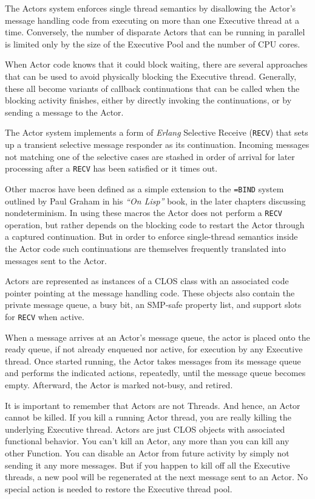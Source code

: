 \documentclass[article,oneside]{memoir}
\begin{document}
The Actors system enforces single thread semantics by disallowing the Actor's message handling code from executing on more than one Executive thread at a time. Conversely, the number of disparate Actors that can be running in parallel is limited only by the size of the Executive Pool and the number of CPU cores.

When Actor code knows that it could block waiting, there are several approaches that can be used to avoid physically blocking the Executive thread. Generally, these all become variants of callback continuations that can be called when the blocking activity finishes, either by directly invoking the continuations, or by sending a message to the Actor. 

The Actor system implements a form of \textit{Erlang} Selective Receive (\texttt{RECV}) that sets up a transient selective message responder as its continuation. Incoming messages not matching one of the selective cases are stashed in order of arrival for later processing after a \texttt{RECV} has been satisfied or it times out.

Other macros have been defined as a simple extension to the \texttt{=BIND} system outlined by Paul Graham in his \textit{``On Lisp''} book, in the later chapters discussing nondeterminism. In using these macros the Actor does not perform a \texttt{RECV} operation, but rather depends on the blocking code to restart the Actor through a captured continuation. But in order to enforce single-thread semantics inside the Actor code such continuations are themselves frequently translated into messages sent to the Actor.

Actors are represented as instances of a CLOS class with an associated code pointer pointing at the message handling code. These objects also contain the private message queue, a busy bit, an SMP-safe property list, and support slots for \texttt{RECV} when active.

When a message arrives at an Actor's message queue, the actor is placed onto the ready queue, if not already enqueued nor active, for execution by any Executive thread. Once started running, the Actor takes messages from its message queue and performs the indicated actions, repeatedly, until the message queue becomes empty. Afterward, the Actor is marked not-busy, and retired. 

It is important to remember that Actors are not Threads. And hence, an Actor cannot be killed. If you kill a running Actor thread, you are really killing the underlying Executive thread. Actors are just CLOS objects with associated functional behavior. You can't kill an Actor, any more than you can kill any other Function. You can disable an Actor from future activity by simply not sending it any more messages. But if you happen to kill off all the Executive threads, a new pool will be regenerated at the next message sent to an Actor. No special action is needed to restore the Executive thread pool.
\end{document}
